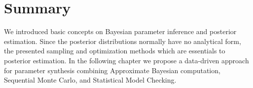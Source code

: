 \section{Summary}
We introduced basic concepts on Bayesian parameter inference and posterior estimation. Since the
posterior distributions normally have no analytical form, the presented sampling and
optimization methods which are essentials to posterior estimation. In the following chapter we
propose a data-driven approach for parameter synthesis combining Approximate Bayesian computation,
Sequential Monte Carlo, and Statistical Model Checking.
